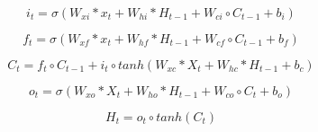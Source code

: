 \begin{equation} \label{eq:CLSTM1_input_gate}
    i_t = \sigma \left( W_{xi}*x_t + W_{hi}*H_{t-1} + W_{ci}\circ C_{t-1}+b_i \right) 
\end{equation}

\begin{equation} \label{eq:CLSTM2_forget_gate}
        f_t = \sigma \left( W_{xf}*x_t + W_{hf}*H_{t-1} + W_{cf}\circ C_{t-1}+b_f \right) 
\end{equation}

\begin{equation} \label{eq:CLSTM3_cellstate}
        C_t = f_t \circ C_{t-1} +i_t\circ tanh\left( W_{xc}*X_t + W_{hc}*H_{t-1} + b_c \right)
\end{equation}

\begin{equation} \label{eq:CLSTM4_output_gate}
        o_t = \sigma \left( W_{xo}*X_t + W_{ho}*H_{t-1} + W_{co}\circ C_{t}+b_o \right)
\end{equation}

\begin{equation} \label{eq:CLSTM5_hidden_state}
        H_t = o_t \circ tanh \left( C_t \right)
\end{equation}


% 